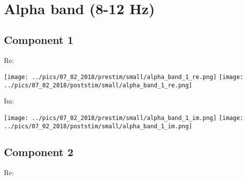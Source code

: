 \documentclass{article}
\begin{document}



\section{Alpha band (8-12 Hz)}
\subsection*{Component 1}
Re:

\hspace{2cm}
\texttt{[image: ../pics/07\_02\_2018/prestim/small/alpha\_band\_1\_re.png]}
\hspace{2cm}
\texttt{[image: ../pics/07\_02\_2018/poststim/small/alpha\_band\_1\_re.png]}

Im:

\hspace{2cm}
\texttt{[image: ../pics/07\_02\_2018/prestim/small/alpha\_band\_1\_im.png]}
\hspace{2cm}
\texttt{[image: ../pics/07\_02\_2018/poststim/small/alpha\_band\_1\_im.png]}

\subsection*{Component 2}
Re:
\end{document}
